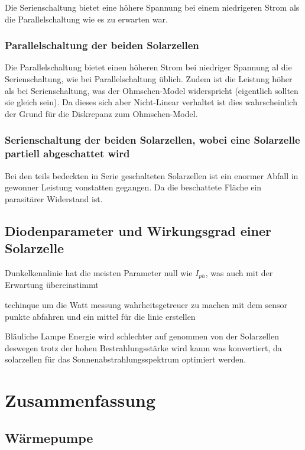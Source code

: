 \documentclass[12pt,english,ngerman]{scrartcl}
\begin{document}
Die Serienschaltung bietet eine höhere Spannung bei einem niedrigeren Strom als
die Parallelschaltung wie es zu erwarten war.

\subsubsection{Parallelschaltung der beiden Solarzellen}

Die Parallelschaltung bietet einen höheren Strom bei niedriger Spannung al die
Serienschaltung, wie bei Parallelschaltung üblich. Zudem ist die Leistung höher
als bei Serienschaltung, was der Ohmschen-Model widerspricht (eigentlich
sollten sie gleich sein). Da dieses sich aber Nicht-Linear verhaltet ist dies
wahrscheinlich der Grund für die Diskrepanz zum Ohmschen-Model.

\subsubsection{Serienschaltung der beiden Solarzellen, wobei eine Solarzelle partiell abgeschattet wird}

Bei den teils bedeckten in Serie geschalteten Solarzellen ist ein enormer
Abfall in gewonner Leistung vonstatten gegangen. Da die beschattete Fläche ein
parasitärer Widerstand ist.

\subsection{Diodenparameter und Wirkungsgrad einer Solarzelle}

Dunkelkennlinie hat die meisten Parameter null wie $I_{ph}$, was auch mit der
Erwartung übereinstimmt

techinque um die Watt messung wahrheitsgetreuer zu machen mit dem sensor punkte
abfahren und ein mittel für die linie erstellen

Bläuliche Lampe Energie wird schlechter auf genommen von der Solarzellen
deswegen trotz der hohen Bestrahlungsstärke wird kaum was konvertiert, da
solarzellen für das Sonnenabstrahlungsspektrum optimiert werden.

\section{Zusammenfassung}\label{sec:zusammenfassung}

\subsection{Wärmepumpe}
\end{document}
